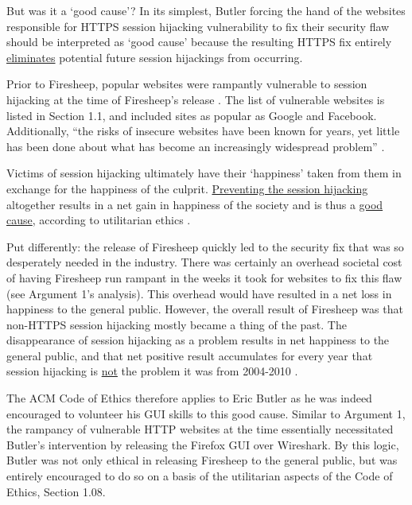 \documentclass[11pt]{article}
\begin{document}
\begin{multicols}{2}
But was it a `good cause'? In its simplest, Butler forcing the hand of the websites responsible for HTTPS session hijacking vulnerability to fix their security flaw should be interpreted as `good cause' because the resulting HTTPS fix entirely \uline{eliminates} potential future session hijackings from occurring. 

Prior to Firesheep, popular websites were rampantly vulnerable to session hijacking at the time of Firesheep's release \cite{firesheep-source}. The list of vulnerable websites is listed in Section 1.1, and included sites as popular as Google and Facebook. Additionally, ``the risks of insecure websites have been known for years, yet little has been done about what has become an increasingly widespread problem'' \cite{butler-fallout}. 

Victims of session hijacking ultimately have their `happiness' taken from them in exchange for the happiness of the culprit. \uline{Preventing the session hijacking} altogether results in a net gain in happiness of the society and is thus a \uline{good cause}, according to utilitarian ethics \cite{virtue-ethics}. 

Put differently: the release of Firesheep quickly led to the security fix that was so desperately needed in the industry. There was certainly an overhead societal cost of having Firesheep run rampant in the weeks it took for websites to fix this flaw (see Argument 1's analysis). This overhead would have resulted in a net loss in happiness to the general public. However, the overall result of Firesheep was that non-HTTPS session hijacking mostly became a thing of the past. The disappearance of session hijacking as a problem results in net happiness to the general public, and that net positive result accumulates for every year that session hijacking is \uline{not} the problem it was from 2004-2010 \cite{firesheep-day-later}.

The ACM Code of Ethics therefore applies to Eric Butler as he was indeed encouraged to volunteer his GUI skills to this good cause. Similar to Argument 1, the rampancy of vulnerable HTTP websites at the time essentially necessitated Butler's intervention by releasing the Firefox GUI over Wireshark. By this logic, Butler was not only ethical in releasing Firesheep to the general public, but was entirely encouraged to do so on a basis of the utilitarian aspects of the Code of Ethics, Section 1.08.



\end{multicols}
\end{document}
